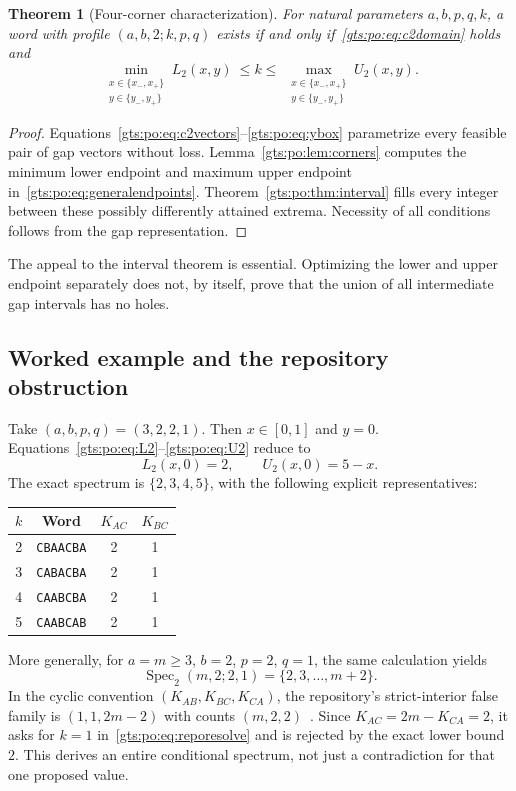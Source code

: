 \documentclass[11pt,letterpaper]{article}
\newtheorem{theorem}{Theorem}[section]
\theoremstyle{definition}
\theoremstyle{remark}
\newcommand{\Spec}{\operatorname{Spec}}
\begin{document}
\begin{theorem}[Four-corner characterization]\label{gts:po:thm:fourcorners}
For natural parameters $a,b,p,q,k$, a word with profile $(a,b,2;k,p,q)$ exists if and only if~\eqref{gts:po:eq:c2domain} holds and
\begin{equation}\label{gts:po:eq:c2main}
 \min_{\substack{x\in\{x_-,x_+\}\\y\in\{y_-,y_+\}}}L_2(x,y)
 \ \le k\le\ 
 \max_{\substack{x\in\{x_-,x_+\}\\y\in\{y_-,y_+\}}}U_2(x,y).
\end{equation}
\end{theorem}
\begin{proof}
Equations~\eqref{gts:po:eq:c2vectors}--\eqref{gts:po:eq:ybox} parametrize every feasible pair of gap vectors without loss. Lemma~\ref{gts:po:lem:corners} computes the minimum lower endpoint and maximum upper endpoint in~\eqref{gts:po:eq:generalendpoints}. Theorem~\ref{gts:po:thm:interval} fills every integer between these possibly differently attained extrema. Necessity of all conditions follows from the gap representation.
\end{proof}
The appeal to the interval theorem is essential. Optimizing the lower and upper endpoint separately does not, by itself, prove that the union of all intermediate gap intervals has no holes.

\subsection{Worked example and the repository obstruction}
Take $(a,b,p,q)=(3,2,2,1)$. Then $x\in[0,1]$ and $y=0$. Equations~\eqref{gts:po:eq:L2}--\eqref{gts:po:eq:U2} reduce to
\[
 L_2(x,0)=2,\qquad U_2(x,0)=5-x.
\]
The exact spectrum is $\{2,3,4,5\}$, with the following explicit representatives:
\begin{center}
\begin{tabular}{cccc}
\toprule
$k$ & Word & $K_{AC}$ & $K_{BC}$\\
\midrule
2 & \texttt{CBAACBA} &2&1\\
3 & \texttt{CABACBA} &2&1\\
4 & \texttt{CAABCBA} &2&1\\
5 & \texttt{CAABCAB} &2&1\\
\bottomrule
\end{tabular}
\end{center}

More generally, for $a=m\ge3$, $b=2$, $p=2$, $q=1$, the same calculation yields
\begin{equation}\label{gts:po:eq:reporesolve}
 \Spec_2(m,2;2,1)=\{2,3,\ldots,m+2\}.
\end{equation}
In the cyclic convention $(K_{AB},K_{BC},K_{CA})$, the repository's strict-interior false family is $(1,1,2m-2)$ with counts $(m,2,2)$~\cite{po-repo}. Since $K_{AC}=2m-K_{CA}=2$, it asks for $k=1$ in~\eqref{gts:po:eq:reporesolve} and is rejected by the exact lower bound $2$. This derives an entire conditional spectrum, not just a contradiction for that one proposed value.
\end{document}
